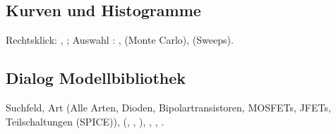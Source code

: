\subsection*{Kurven und Histogramme}

Rechtsklick: , ;
Auswahl : ,  (Monte Carlo),  (Sweeps).

\subsection*{Dialog Modellbibliothek}

Suchfeld, Art (Alle Arten, Dioden, Bipolartransistoren, MOSFETs, JFETs,
Teilschaltungen (SPICE)),  (,
, ), ,
, .
